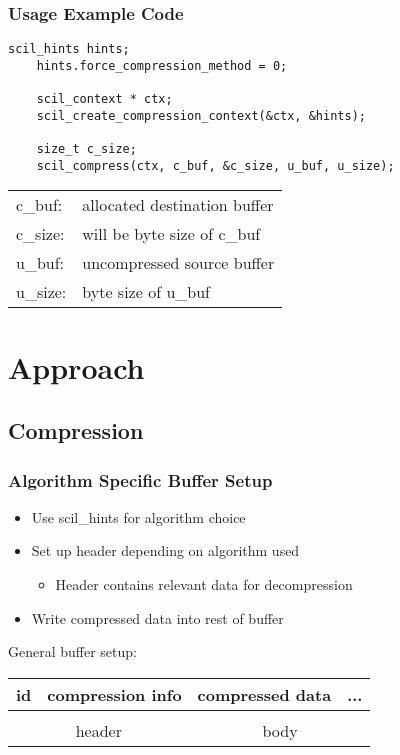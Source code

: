 \documentclass[compress]{beamer}
\begin{document}
\begin{frame}[fragile]
	\frametitle{Usage Example Code}

	\begin{lstlisting}[caption=SCIL usage example]
	scil_hints hints;
	hints.force_compression_method = 0;

	scil_context * ctx;
	scil_create_compression_context(&ctx, &hints);

	size_t c_size;
	scil_compress(ctx, c_buf, &c_size, u_buf, u_size);
	\end{lstlisting}

	\footnotesize{
	\begin{tabular}{ll}
		c\_buf: & allocated destination buffer \\
		c\_size: & will be byte size of c\_buf \\
		u\_buf: & uncompressed source buffer \\
		u\_size: & byte size of u\_buf
	\end{tabular}
	}

\end{frame}

\section{Approach}
\subsection{Compression}

\begin{frame}
	\frametitle{Algorithm Specific Buffer Setup}

	\begin{itemize}
		\item Use scil\_hints for algorithm choice
		\item Set up header depending on algorithm used
		\begin{itemize}
			\item Header contains relevant data for decompression
		\end{itemize}
		\item Write compressed data into rest of buffer
	\end{itemize}

	\bigskip

	General buffer setup:\\
	\begin{center}
	\begin{tabular}{|c|c|cc|}
		\hline
		id & compression info & compressed data & ... \\
		\hline
		\multicolumn{2}{|c|}{} & \multicolumn{2}{c|}{} \\
		\multicolumn{2}{c}{header} & \multicolumn{2}{c}{body}
	\end{tabular}
	\end{center}
\end{frame}
\end{document}
